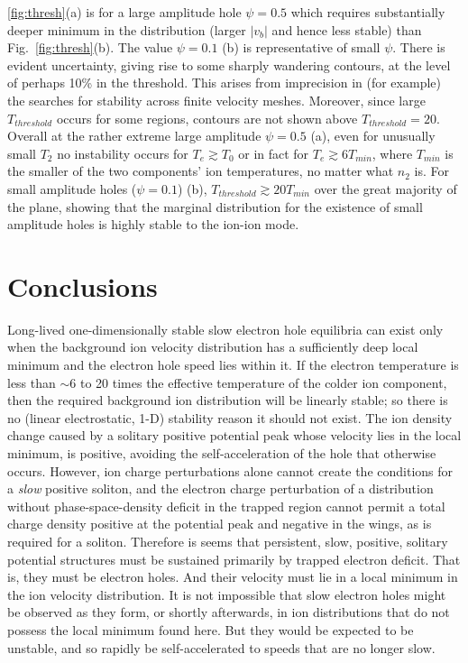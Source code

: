\documentclass[12pt]{article}
\begin{document}
\ref{fig:thresh}(a) is for a large amplitude hole $\psi=0.5$ which
requires substantially deeper minimum in the distribution (larger
$|v_b|$ and hence less stable) than Fig.\ \ref{fig:thresh}(b). The
value $\psi=0.1$ (b) is representative of small $\psi$. There is evident
uncertainty, giving rise to some sharply wandering contours, at the
level of perhaps 10\% in the threshold. This arises from imprecision
in (for example) the searches for stability across finite velocity
meshes. Moreover, since large $T_{threshold}$ occurs for some regions,
contours are not shown above $T_{threshold}=20$. Overall at the rather
extreme large amplitude $\psi=0.5$ (a), even for unusually small $T_2$
no instability occurs for $T_e\gtrsim T_0$ or in fact for
$T_e\gtrsim 6 T_{min}$, where $T_{min}$ is the smaller of the two
components' ion temperatures, no matter what $n_2$ is. For small
amplitude holes ($\psi=0.1$) (b), $T_{threshold}\gtrsim 20 T_{min}$
over the great majority of the plane, showing that the marginal
distribution for the existence of small amplitude holes is highly
stable to the ion-ion mode.

\section{Conclusions}

Long-lived one-dimensionally stable slow electron hole equilibria can
exist only when the background ion velocity distribution has a
sufficiently deep local minimum and the electron hole speed lies
within it. If the electron temperature is less than $\sim 6$ to 20
times the effective temperature of the colder ion component, then the
required background ion distribution will be linearly stable; so there
is no (linear electrostatic, 1-D) stability reason it should not
exist. The ion density change caused by a solitary positive potential
peak whose velocity lies in the local minimum, is positive, avoiding
the self-acceleration of the hole that otherwise occurs. However, ion
charge perturbations alone cannot create the conditions for a
\emph{slow} positive soliton, and the electron charge perturbation of
a distribution without phase-space-density deficit in the trapped
region cannot permit a total charge density positive at the potential
peak and negative in the wings, as is required for a
soliton. Therefore is seems that persistent, slow, positive, solitary
potential structures must be sustained primarily by trapped electron
deficit. That is, they must be electron holes. And their velocity must
lie in a local minimum in the ion velocity distribution. It is not
impossible that slow electron holes might be observed as they form, or
shortly afterwards, in ion distributions that do not possess the local
minimum found here. But they would be expected to be unstable, and so
rapidly be self-accelerated to speeds that are no longer slow.
\end{document}
